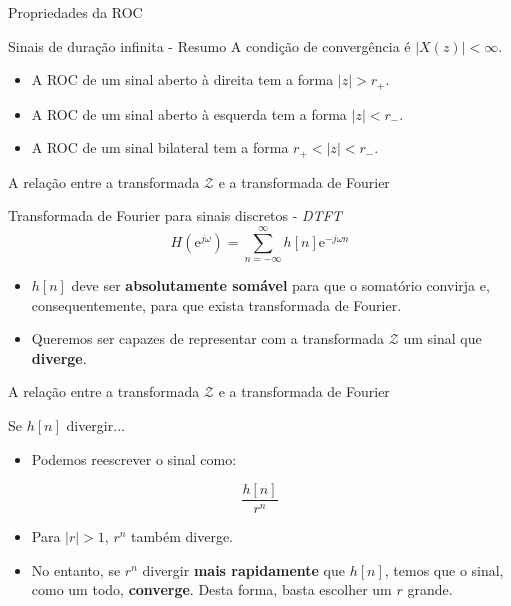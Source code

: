 \begin{frame}{Propriedades da ROC}
\begin{block}{Sinais de duração infinita - Resumo}
	A condição de convergência é $ |X(z)| < \infty $.
	\begin{itemize}
		\item A ROC de um sinal aberto à direita tem a forma $ |z| > r_{+} $.
		\item A ROC de um sinal aberto à esquerda tem a forma $ |z| <  r_{-} $.
		\item A ROC de um sinal bilateral tem a forma $ r_{+} < |z| < r_{-} $.
	\end{itemize}
\end{block}
\end{frame}

\begin{frame}{A relação entre a transformada $\mathcal{Z}$ e a transformada de Fourier}
\begin{block}{Transformada de Fourier para sinais discretos - \textit{DTFT}}
$$H(\text{e}^{j\omega}) = \sum_{n=-\infty}^{\infty}h[n]\text{e}^{-j\omega n}$$
\begin{itemize}
    \item $h[n]$ deve ser \textbf{absolutamente somável} para que o somatório convirja e, consequentemente, para que exista transformada de Fourier.
    \item Queremos ser capazes de representar com a transformada $\mathcal{Z}$ um sinal que \textbf{diverge}.
\end{itemize}
\end{block}
\end{frame}

\begin{frame}{A relação entre a transformada $\mathcal{Z}$ e a transformada de Fourier}
\begin{block}{Se $h[n]$ divergir...}
\begin{itemize}
    \item Podemos reescrever o sinal como:
\end{itemize}
$$\dfrac{h[n]}{r^n}$$
\begin{itemize}
    \item Para $|r| > 1$, $r^n$ também diverge.
    \item No entanto, se $r^n$ divergir \textbf{mais rapidamente} que $h[n]$, temos que o sinal, como um todo, \textbf{converge}. Desta forma, basta escolher um $r$ grande. 
\end{itemize}
\end{block}
\vspace{0.2cm}
\centering
\scalebox{0.8}{}
\end{frame}

